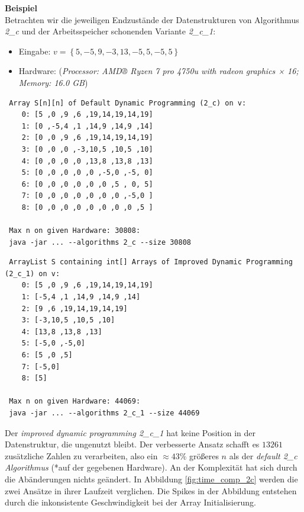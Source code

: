\documentclass[10pt]{article}
\begin{document}
 \textbf{Beispiel}\\
 Betrachten wir die jeweiligen Endzustände der Datenstrukturen von Algorithmus \textit{2\_c} und der 
 Arbeitsspeicher schonenden Variante \textit{2\_c\_1}:
 \begin{itemize}
     \item Eingabe: $v = \left\{5, -5, 9, -3, 13, -5, 5, -5, 5\right\}$
     \item Hardware: (\textit{Processor: AMD® Ryzen 7 pro 4750u with radeon graphics × 16; Memory: 16.0 GB})
 \end{itemize}

\begin{verbatim}
 Array S[n][n] of Default Dynamic Programming (2_c) on v:
    0: [5 ,0 ,9 ,6 ,19,14,19,14,19]
    1: [0 ,-5,4 ,1 ,14,9 ,14,9 ,14]
    2: [0 ,0 ,9 ,6 ,19,14,19,14,19]
    3: [0 ,0 ,0 ,-3,10,5 ,10,5 ,10]
    4: [0 ,0 ,0 ,0 ,13,8 ,13,8 ,13]
    5: [0 ,0 ,0 ,0 ,0 ,-5,0 ,-5, 0]
    6: [0 ,0 ,0 ,0 ,0 ,0 ,5 , 0, 5]
    7: [0 ,0 ,0 ,0 ,0 ,0 ,0 ,-5,0 ]
    8: [0 ,0 ,0 ,0 ,0 ,0 ,0 ,0 ,5 ]
                               
 Max n on given Hardware: 30808:
 java -jar ... --algorithms 2_c --size 30808
\end{verbatim}

\begin{verbatim}
 ArrayList S containing int[] Arrays of Improved Dynamic Programming (2_c_1) on v:
    0: [5 ,0 ,9 ,6 ,19,14,19,14,19]
    1: [-5,4 ,1 ,14,9 ,14,9 ,14]
    2: [9 ,6 ,19,14,19,14,19]
    3: [-3,10,5 ,10,5 ,10]
    4: [13,8 ,13,8 ,13]
    5: [-5,0 ,-5,0]
    6: [5 ,0 ,5]
    7: [-5,0]
    8: [5]

 Max n on given Hardware: 44069:
 java -jar ... --algorithms 2_c_1 --size 44069
\end{verbatim}

Der \textit{improved dynamic programming 2\_c\_1} hat keine Position in der 
Datenstruktur, die ungenutzt bleibt. Der verbesserte Ansatz schafft es $13261$ zusätzliche
Zahlen zu verarbeiten, also ein $\approx 43\%$ grö\ss eres $n$ als der \textit{default 2\_c Algorithmus} 
(*auf der gegebenen Hardware). An der Komplexität hat sich durch die Abänderungen nichts geändert.
In Abbildung \ref{fig:time_comp_2c} werden die zwei Ansätze in ihrer Laufzeit verglichen.
Die Spikes in der Abbildung entstehen durch die inkonsistente Geschwindigkeit bei der Array Initialisierung.
\end{document}
